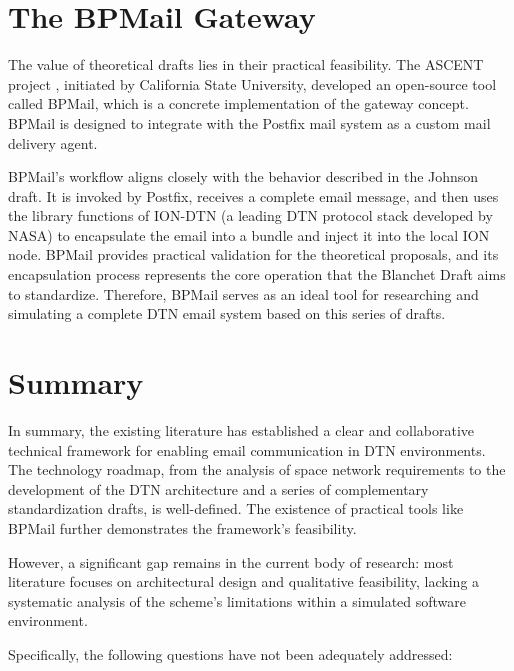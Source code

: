 \section{The BPMail Gateway}

The value of theoretical drafts lies in their practical feasibility. The ASCENT project \cite{bpmail}, initiated by California State University, developed an open-source tool called BPMail, which is a concrete implementation of the gateway concept. BPMail is designed to integrate with the Postfix mail system as a custom mail delivery agent.

BPMail's workflow aligns closely with the behavior described in the Johnson draft. It is invoked by Postfix, receives a complete email message, and then uses the library functions of ION-DTN (a leading DTN protocol stack developed by NASA) to encapsulate the email into a bundle and inject it into the local ION node. BPMail provides practical validation for the theoretical proposals, and its encapsulation process represents the core operation that the Blanchet Draft aims to standardize. Therefore, BPMail serves as an ideal tool for researching and simulating a complete DTN email system based on this series of drafts.

\section{Summary}

In summary, the existing literature has established a clear and collaborative technical framework for enabling email communication in DTN environments. The technology roadmap, from the analysis of space network requirements to the development of the DTN architecture and a series of complementary standardization drafts, is well-defined. The existence of practical tools like BPMail further demonstrates the framework's feasibility.

However, a significant gap remains in the current body of research: most literature focuses on architectural design and qualitative feasibility, lacking a systematic analysis of the scheme's limitations within a simulated software environment.

Specifically, the following questions have not been adequately addressed:

